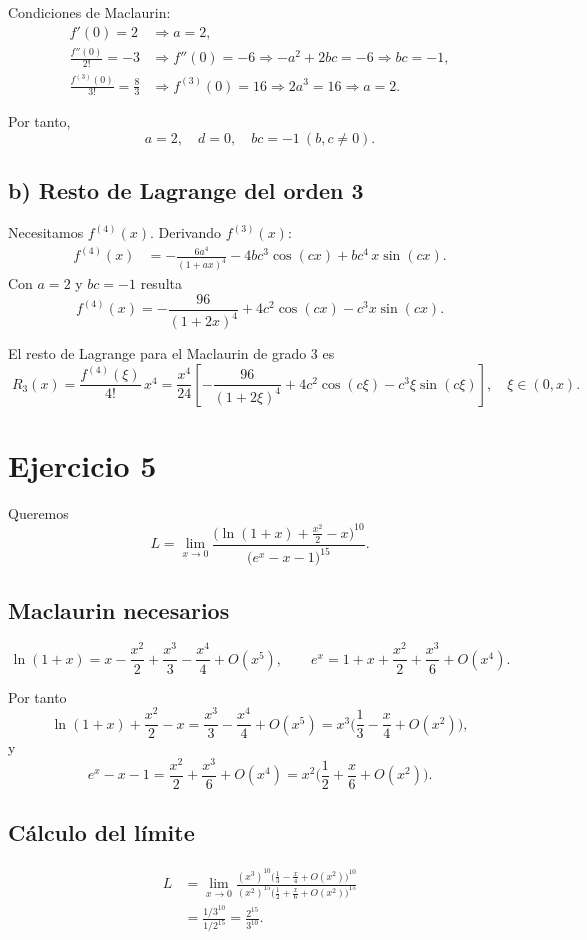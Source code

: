 \documentclass[12pt]{article}
\begin{document}
Condiciones de Maclaurin:
\[
\begin{aligned}
f'(0)=2 &\Rightarrow a=2,\\
\frac{f''(0)}{2!}=-3 &\Rightarrow f''(0)=-6 \Rightarrow -a^2+2bc=-6 \Rightarrow bc=-1,\\
\frac{f^{(3)}(0)}{3!}=\frac{8}{3} &\Rightarrow f^{(3)}(0)=16 \Rightarrow 2a^3=16 \Rightarrow a=2.
\end{aligned}
\]

Por tanto,
\[
\boxed{a=2,\quad d=0,\quad bc=-1\ (b,c\neq 0).}
\]

\subsection*{b) Resto de Lagrange del orden 3}

Necesitamos \(f^{(4)}(x)\). Derivando \(f^{(3)}(x)\):
\[
\begin{aligned}
f^{(4)}(x)
&= -\frac{6a^4}{(1+ax)^4} -4bc^3\cos(cx) + bc^4\,x\sin(cx).
\end{aligned}
\]
Con \(a=2\) y \(bc=-1\) resulta
\[
\boxed{\,f^{(4)}(x)= -\frac{96}{(1+2x)^4} + 4c^{2}\cos(cx) - c^{3}x\sin(cx).\,}
\]

El resto de Lagrange para el Maclaurin de grado 3 es
\[
\boxed{\;
R_3(x)=\frac{f^{(4)}(\xi)}{4!}\,x^{4}
=\frac{x^{4}}{24}\left[-\frac{96}{(1+2\xi)^4}+4c^{2}\cos(c\xi)-c^{3}\xi\sin(c\xi)\right],
\quad \xi\in(0,x).
\;}
\]

\section*{Ejercicio 5}

Queremos
\[
L=\lim_{x\to 0}\frac{\Big(\ln(1+x)+\frac{x^{2}}{2}-x\Big)^{10}}{\big(e^{x}-x-1\big)^{15}}.
\]

\subsection*{Maclaurin necesarios}
\[
\ln(1+x)=x-\frac{x^{2}}{2}+\frac{x^{3}}{3}-\frac{x^{4}}{4}+O(x^{5}),
\qquad
e^{x}=1+x+\frac{x^{2}}{2}+\frac{x^{3}}{6}+O(x^{4}).
\]

Por tanto
\[
\ln(1+x)+\frac{x^{2}}{2}-x=\frac{x^{3}}{3}-\frac{x^{4}}{4}+O(x^{5})
=x^{3}\Big(\frac{1}{3}-\frac{x}{4}+O(x^{2})\Big),
\]
y
\[
e^{x}-x-1=\frac{x^{2}}{2}+\frac{x^{3}}{6}+O(x^{4})
=x^{2}\Big(\frac{1}{2}+\frac{x}{6}+O(x^{2})\Big).
\]

\subsection*{Cálculo del límite}
\[
\begin{aligned}
L
&=\lim_{x\to 0}\frac{\left(x^{3}\right)^{10}\!\!\Big(\frac{1}{3}-\frac{x}{4}+O(x^{2})\Big)^{10}}
{\left(x^{2}\right)^{15}\!\!\Big(\frac{1}{2}+\frac{x}{6}+O(x^{2})\Big)^{15}}\\[4pt]
&=\frac{1/3^{10}}{1/2^{15}}
=\boxed{\frac{2^{15}}{3^{10}}}.
\end{aligned}
\]
\end{document}
